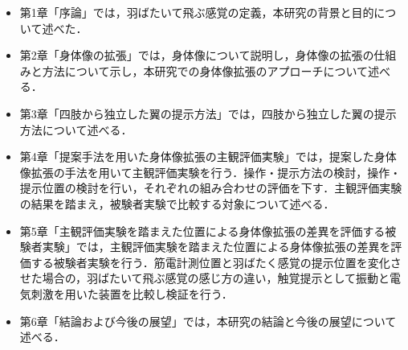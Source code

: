         \begin{itemize}
                \item 第1章「序論」では，羽ばたいて飛ぶ感覚の定義，本研究の背景と目的について述べた．
                
                \item 第2章「身体像の拡張」では，身体像について説明し，身体像の拡張の仕組みと方法について示し，本研究での身体像拡張のアプローチについて述べる．
                
                \item 第3章「四肢から独立した翼の提示方法」では，四肢から独立した翼の提示方法について述べる．
                
                \item 第4章「提案手法を用いた身体像拡張の主観評価実験」では，提案した身体像拡張の手法を用いて主観評価実験を行う．操作・提示方法の検討，操作・提示位置の検討を行い，それぞれの組み合わせの評価を下す．主観評価実験の結果を踏まえ，被験者実験で比較する対象について述べる．
                
                \item 第5章「主観評価実験を踏まえた位置による身体像拡張の差異を評価する被験者実験」では，主観評価実験を踏まえた位置による身体像拡張の差異を評価する被験者実験を行う．筋電計測位置と羽ばたく感覚の提示位置を変化させた場合の，羽ばたいて飛ぶ感覚の感じ方の違い，触覚提示として振動と電気刺激を用いた装置を比較し検証を行う．
                
                \item 第6章「結論および今後の展望」では，本研究の結論と今後の展望について述べる．
        \end{itemize}
        
        


        
